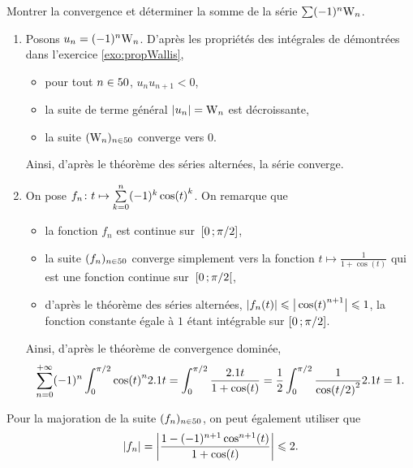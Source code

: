 


\begin{exercice}
Montrer la convergence et déterminer la somme de la série $\sum (-1)^n \Wallis_n$.
\end{exercice}

\begin{solution}
\begin{enumerate}
\item Posons $u_n = (-1)^n \Wallis_n$. D'après les propriétés des intégrales de  démontrées dans l'exercice \ref{exo:propWallis},
\begin{itemize}
\item pour tout $n \in \N$, $u_n u_{n+1} < 0$,
\item la suite de terme général $\abs{u_n} = \Wallis_n$ est décroissante,
\item la suite $(\Wallis_n)_{n \in \N}$ converge vers $0$.
\end{itemize}
Ainsi, d'après le théorème des séries alternées, la série converge.

\item On pose $\fonctionligne[f_n]{t}{\sum\limits_{k=0}^n (-1)^k \cos(t)^k}$. On remarque que
\begin{itemize}
\item la fonction $f_n$ est continue sur~$\interff{0}{\pi/2}$,
\item la suite $(f_n)_{n \in \N}$ converge simplement vers la fonction $t \mapsto \frac{1}{1 + \cos(t)}$ qui est une fonction continue sur~$\interfo{0}{\pi/2}$,
\item d'après le théorème des séries alternées, $\abs{f_n(t)} \leqslant \big|\cos(t)^{n+1}\big| \leqslant 1$, la fonction constante égale à $1$ étant intégrable sur $\interff{0}{\pi/2}$.
\end{itemize}
Ainsi, d'après le théorème de convergence dominée,
\[
\sum_{n=0}^{+\infty} (-1)^n \int_0^{\pi/2} \cos(t)^n \d t
= \int_0^{\pi/2} \frac{\d t}{1 + \cos(t)}
= \frac{1}{2} \int_0^{\pi/2} \frac{1}{\cos(t/2)^2} \d t
= 1.
\]
\end{enumerate}
\end{solution}

\begin{remarque}
Pour la majoration de la suite $(f_n)_{n \in \N}$, on peut également utiliser que
\[
\abs{f_n}
= \module{\frac{1 - (-1)^{n+1} \cos^{n+1}(t)}{1 + \cos(t)}}
\leqslant 2.
\]

\end{remarque}

